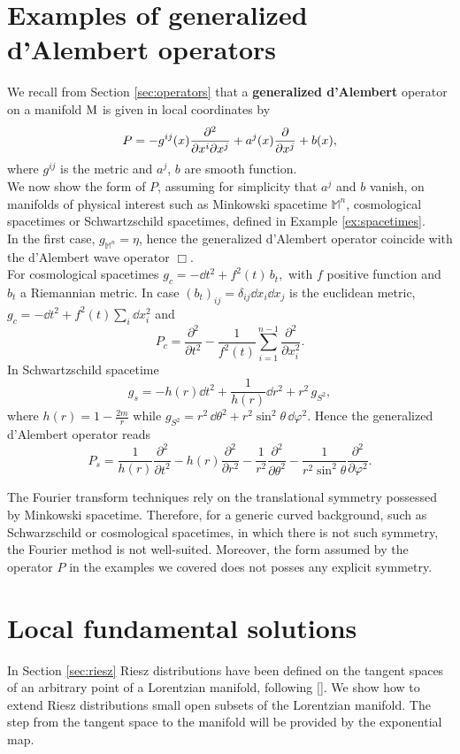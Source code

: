 \section{Examples of generalized d'Alembert operators}
We recall from Section \ref{sec:operators} that a \textbf{generalized d'Alembert} operator on a manifold $\mathrm{M}$ is given in local coordinates by
\begin{equation}
P=-g^{ij}(x)\frac{\partial^2}{\partial x^i\partial x^j}+a^j(x)\frac{\partial }{\partial x^j}+b(x),
\label{eq:generalizedAlembert}
\end{equation}
where $g^{ij}$ is the metric and $a^j$, $b$ are smooth function.\\

\noindent We now show the form of $P$, assuming for simplicity that $a^j$ and $b$ vanish, on manifolds of physical interest such as Minkowski spacetime $\mathbb{M}^n$, cosmological spacetimes or Schwartzschild spacetimes, defined in Example \ref{ex:spacetimes}.\\
In the first case, $g_{\mathbb{M}^n}=\eta$, hence the generalized d'Alembert operator coincide with the d'Alembert wave operator $\Box$.\\
For cosmological spacetimes $g_c= -\dd t^2 + f^2(t)\, b_t,$ with $f$ positive function and $b_t$ a Riemannian metric. In case $(b_t)_{ij}=\delta_{ij}\dd x_i\dd x_j$ is the euclidean metric, $g_c= -\dd t^2 + f^2(t)\sum_i\dd x_i^2$ and
\[	P_c=\frac{\partial^2}{\partial t^2}	- \frac{1}{f^2(t)}\sum_{i=1}^{n-1} \frac{\partial^2}{\partial x_i^2}.	\]
\noindent In Schwartzschild spacetime $$g_s=-h(r)\dd t^2+\frac{1}{h(r)}\dd r^2	+r^2\,g_{S^2},$$ where $h(r)=1-\frac{2m}{r}$ while $g_{S^2}=r^2\,\dd\theta^2+r^2\sin^2\theta\,\dd\varphi^2$. Hence the generalized d'Alembert operator reads
\[	P_s=	\frac{1}{h(r)}\frac{\partial^2}{\partial t^2}-{h(r)}\frac{\partial^2}{\partial r^2}-\frac{1}{r^2}\frac{\partial^2}{\partial \theta^2}-\frac{1}{r^2\sin^2\theta}\frac{\partial^2}{\partial \varphi^2}.	\]

\noindent The Fourier transform techniques rely on the translational symmetry possessed by Minkowski spacetime. Therefore, for a generic curved background, such as Schwarzschild or cosmological spacetimes, in which there is not such symmetry, the Fourier method is not well-suited. Moreover, the form assumed by the operator $P$ in the examples we covered does not posses any explicit symmetry.


\section{Local fundamental solutions}
In Section \ref{sec:riesz} Riesz distributions have been defined on the tangent spaces of an arbitrary point of a Lorentzian manifold, following [\citealp{ginoux}].
We show how to extend Riesz distributions small open subsets of the Lorentzian manifold. The step from the tangent space to the manifold will be provided by the exponential map.


